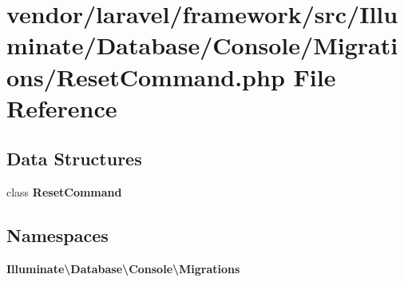\section{vendor/laravel/framework/src/\+Illuminate/\+Database/\+Console/\+Migrations/\+Reset\+Command.php File Reference}
\label{_reset_command_8php}
\subsection*{Data Structures}
\begin{DoxyCompactItemize}
\item 
class {\bf Reset\+Command}
\end{DoxyCompactItemize}
\subsection*{Namespaces}
\begin{DoxyCompactItemize}
\item 
 {\bf Illuminate\textbackslash{}\+Database\textbackslash{}\+Console\textbackslash{}\+Migrations}
\end{DoxyCompactItemize}

